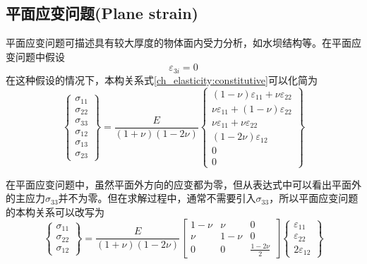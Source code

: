\subsection{平面应变问题(Plane strain)}
平面应变问题可描述具有较大厚度的物体面内受力分析，如水坝结构等。在平面应变问题中假设
\begin{equation}
\varepsilon_{3i} = 0
\end{equation}
在这种假设的情况下，本构关系式\eqref{ch_elasticity:constitutive}可以化简为
\begin{equation}
\begin{Bmatrix}
\sigma_{11} \\ \sigma_{22} \\ \sigma_{33} \\ \sigma_{12} \\ \sigma_{13} \\ \sigma_{23}
\end{Bmatrix} = \frac{E}{(1+\nu)(1-2\nu)}
\begin{Bmatrix}
    (1-\nu)\varepsilon_{11} + \nu \varepsilon_{22} \\ \nu\varepsilon_{11} + (1-\nu)\varepsilon_{22} \\ \nu\varepsilon_{11} + \nu\varepsilon_{22} \\ (1-2\nu)\varepsilon_{12} \\ 0 \\ 0
\end{Bmatrix}
\end{equation}\par
在平面应变问题中，虽然平面外方向的应变都为零，但从表达式中可以看出平面外的主应力$\sigma_{33}$并不为零。但在求解过程中，通常不需要引入$\sigma_{33}$，所以平面应变问题的本构关系可以改写为
\begin{equation}
\begin{Bmatrix}
\sigma_{11} \\ \sigma_{22} \\ \sigma_{12}
\end{Bmatrix} = \frac{E}{(1+\nu)(1-2\nu)}
\begin{bmatrix}
    1-\nu & \nu & 0 \\
    \nu & 1-\nu & 0 \\
    0 & 0 & \frac{1-2\nu}{2}
\end{bmatrix}
\begin{Bmatrix}
\varepsilon_{11} \\ \varepsilon_{22} \\ 2\varepsilon_{12}
\end{Bmatrix}
\end{equation}

